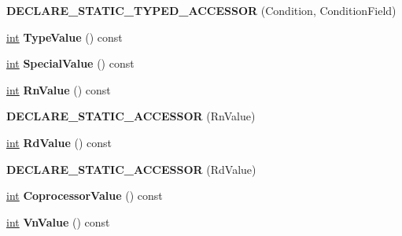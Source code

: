 \begin{DoxyCompactItemize}
\item 
\mbox{\label{classv8_1_1internal_1_1Instruction_aefb75415931ab56f48ec8612fd195fe1}} 
{\bfseries D\+E\+C\+L\+A\+R\+E\+\_\+\+S\+T\+A\+T\+I\+C\+\_\+\+T\+Y\+P\+E\+D\+\_\+\+A\+C\+C\+E\+S\+S\+OR} (Condition, Condition\+Field)
\item 
\mbox{\label{classv8_1_1internal_1_1Instruction_abf7844f4bd126f56021728b214bab8e7}} 
\mbox{\hyperlink{classint}{int}} {\bfseries Type\+Value} () const
\item 
\mbox{\label{classv8_1_1internal_1_1Instruction_adca48fdda66bb4be9c1cf15452852aef}} 
\mbox{\hyperlink{classint}{int}} {\bfseries Special\+Value} () const
\item 
\mbox{\label{classv8_1_1internal_1_1Instruction_ad92b6245dbbeeb9844fb3838cea91689}} 
\mbox{\hyperlink{classint}{int}} {\bfseries Rn\+Value} () const
\item 
\mbox{\label{classv8_1_1internal_1_1Instruction_ab12d631dbfe50f0c6ab356a7e138deee}} 
{\bfseries D\+E\+C\+L\+A\+R\+E\+\_\+\+S\+T\+A\+T\+I\+C\+\_\+\+A\+C\+C\+E\+S\+S\+OR} (Rn\+Value)
\item 
\mbox{\label{classv8_1_1internal_1_1Instruction_ac09f058b171881da57d75cc04bfdfe58}} 
\mbox{\hyperlink{classint}{int}} {\bfseries Rd\+Value} () const
\item 
\mbox{\label{classv8_1_1internal_1_1Instruction_ad67155f61390ac8e7da933f4d62f6323}} 
{\bfseries D\+E\+C\+L\+A\+R\+E\+\_\+\+S\+T\+A\+T\+I\+C\+\_\+\+A\+C\+C\+E\+S\+S\+OR} (Rd\+Value)
\item 
\mbox{\label{classv8_1_1internal_1_1Instruction_adbe76ce98bb231bd822d7635a032f3e9}} 
\mbox{\hyperlink{classint}{int}} {\bfseries Coprocessor\+Value} () const
\item 
\mbox{\label{classv8_1_1internal_1_1Instruction_aa655887f8e6b5791188e506073eefafb}} 
\mbox{\hyperlink{classint}{int}} {\bfseries Vn\+Value} () const

\end{DoxyCompactItemize}
